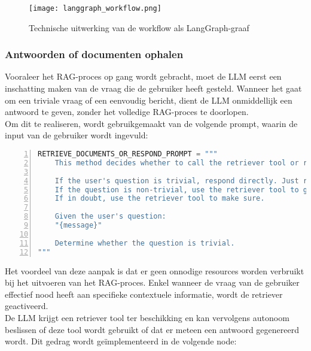 \begin{figure}[H]
    \centering
    \texttt{[image: langgraph\_workflow.png]}
    \caption{Technische uitwerking van de workflow als LangGraph-graaf}
    \label{fig:langgraph}
\end{figure}

\subsubsection{Antwoorden of documenten ophalen}

Vooraleer het RAG-proces op gang wordt gebracht, moet de LLM eerst een inschatting maken van de vraag die de gebruiker heeft gesteld. Wanneer het gaat om een triviale vraag of een eenvoudig bericht, dient de LLM onmiddellijk een antwoord te geven, zonder het volledige RAG-proces te doorlopen.
\\[1em]
Om dit te realiseren, wordt gebruikgemaakt van de volgende prompt, waarin de input van de gebruiker wordt ingevuld: 

\begin{lstlisting}[basicstyle=\small, frame=single, breaklines=true, postbreak=\mbox{\textcolor{red}{$\hookrightarrow$}\space}, escapeinside ={\%,}, escapechar={!}, numbers=left, language=Python, caption=Prompt voor beslissen tussen direct antwoord of documentopvraging]
RETRIEVE_DOCUMENTS_OR_RESPOND_PROMPT = """
    This method decides whether to call the retriever tool or respond directly.
    
    If the user's question is trivial, respond directly. Just respond directly. Do not show your reasoning or thinking process.
    If the question is non-trivial, use the retriever tool to generate a response.
    If in doubt, use the retriever tool to make sure.
    
    Given the user's question:  
    "{message}"
    
    Determine whether the question is trivial. 
"""
\end{lstlisting}

Het voordeel van deze aanpak is dat er geen onnodige resources worden verbruikt bij het uitvoeren van het RAG-proces. Enkel wanneer de vraag van de gebruiker effectief nood heeft aan specifieke contextuele informatie, wordt de retriever geactiveerd.
\\[1em]
De LLM krijgt een retriever tool ter beschikking en kan vervolgens autonoom beslissen of deze tool wordt gebruikt of dat er meteen een antwoord gegenereerd wordt. Dit gedrag wordt geïmplementeerd in de volgende node:

